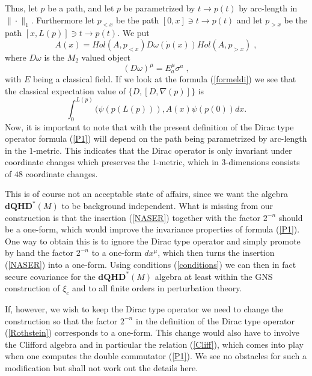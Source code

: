 \documentclass[12pt]{article}
\begin{document}
Thus, let $p$ be a path, and let $p$ be parametrized by $t\to p(t)$ by arc-length in $\| \cdot \|_1$.  
Furthermore let $p_{<x}$ be the path $[0,x] \ni t\to p(t)$ and let $p_{>x}$ be the path $[x,L(p)] \ni t\to p(t)$. 
We put 
$$
A(x)=Hol (A,p_{<x})D\omega (\dot{p}(x))Hol (A,p_{>x})\;,
$$ 
where $D\omega$ is the $M_2$ valued object
\begin{equation}
(D\omega)^\mu =E_a^\mu \sigma^ a  \;,
\label{NASER}
\end{equation}
with $E$ being a classical field.
If we look at the formula (\ref{formeldi}) we see that the classical expectation value of $\{ D,[D,\nabla(p)]\}$ is
\begin{equation}
\int_{0}^{L(p)}  ( \psi(p(L(p))),A(x)\psi (p(0)) dx .  
\label{P1}
\end{equation}
Now, it is important to note that with the present definition of the Dirac type operator formula (\ref{P1}) will depend on the path being parametrized by arc-length in the $1$-metric. This indicates that the Dirac operator is only invariant under coordinate changes which preserves the $1$-metric, which in $3$-dimensions consists of $48$ coordinate changes. 

This is of course not an acceptable state of affairs, since we want the algebra $\mathbf{dQHD}^*(M)$ to be background independent. What is missing from our construction is that the insertion (\ref{NASER}) together with the factor $2^{-n}$ should be a one-form, which would improve the invariance properties of formula (\ref{P1}). One way to obtain this is to ignore the Dirac type operator and simply promote by hand the factor $2^{-n}$ to a one-form $dx^\mu$, which then turns the insertion (\ref{NASER}) into a one-form. Using conditions (\ref{conditions}) we can then in fact secure covariance for the $\mathbf{dQHD}^*(M)$ algebra at least within the GNS construction of $\xi_c$ and to all finite orders in perturbation theory.


If, however, we wish to keep the Dirac type operator we need to change the construction so that the factor $2^{-n}$ in the definition of the Dirac type operator (\ref{Rothstein}) corresponds to a one-form. This change would also have to involve the Clifford algebra and in particular the relation (\ref{Cliff}), which comes into play when one computes the double commutator (\ref{P1}). We see no obstacles for such a modification but shall not work out the details here. %
 
\end{document}
